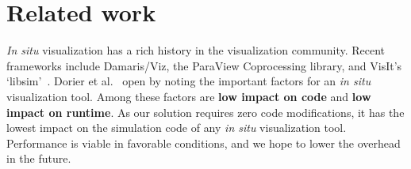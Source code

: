 %


\section{Related work}

\textit{In situ} visualization has a rich history in the visualization
community.  Recent frameworks include Damaris/Viz, the ParaView
Coprocessing library, and VisIt's `libsim'~\cite{Dorier:2013:Damaris,
Fabian:2011:Catalyst, Whitlock:2011:Libsim}. Dorier et
al.~\cite{Dorier:2013:Damaris} open
by noting the important factors for an \textit{in situ} visualization
tool. Among these factors are \textbf{low impact on code} and
\textbf{low impact on runtime}.  As our solution requires zero code
modifications, it has the lowest impact on the simulation code of any
\textit{in situ} visualization tool.  Performance is viable in
favorable conditions, and we hope to lower the overhead in the future.


